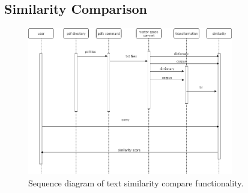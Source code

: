 \subsection{Similarity Comparison}
	\begin{figure}[htb]
		\begin{center}
			\includegraphics[width=0.8\textwidth]{Rainy_Sequence_diagram}
		\end{center}
		\caption{Sequence diagram of text similarity compare functionality.\label{Sequence diagram}}
	\end{figure}
	\newpage